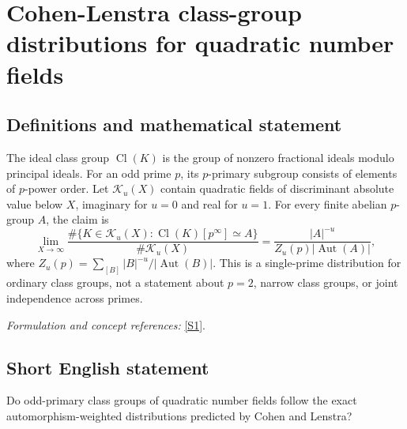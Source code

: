 \documentclass[11pt,a4paper]{article}
\newcommand{\sref}[2]{\hyperlink{source:#1:#2}{[S#2]}}
\newif\ifshowcatalogue
\newcommand{\cataloguescope}[1]{\ifshowcatalogue
 \paragraph{Exact scope in the supplied catalogue.}
 \begin{quote}\small #1\end{quote}\fi}
\numberwithin{equation}{section}
\begin{document}
\setcounter{section}{0}
\clearpage
\section*{\texorpdfstring{Cohen-Lenstra class-group distributions for quadratic number fields}{Cohen-Lenstra class-group distributions for quadratic number fields}}\label{statement}
\subsection{Definitions and mathematical statement}
The ideal class group $\operatorname{Cl}(K)$ is the group of nonzero fractional ideals modulo principal ideals. For an odd prime $p$, its $p$-primary subgroup consists of elements of $p$-power order. Let $\mathcal K_u(X)$ contain quadratic fields of discriminant absolute value below $X$, imaginary for $u=0$ and real for $u=1$. For every finite abelian $p$-group $A$, the claim is
\[
 \lim_{X\to\infty}\frac{\#\{K\in\mathcal K_u(X):\operatorname{Cl}(K)[p^\infty]\simeq A\}}
 {\#\mathcal K_u(X)}=\frac{|A|^{-u}}{Z_u(p)|\operatorname{Aut}(A)|},
\]
where $Z_u(p)=\sum_{[B]}|B|^{-u}/|\operatorname{Aut}(B)|$. This is a single-prime distribution for ordinary class groups, not a statement about $p=2$, narrow class groups, or joint independence across primes.
\par\smallskip\textit{Formulation and concept references:} \sref{statement}{1}.
\cataloguescope{For u in \{0,1\} let K\_u(X) be the set of isomorphism classes of quadratic number fields K with |disc(K)| < X that are imaginary (u = 0) or real (u = 1). For each fixed odd prime p and each finite abelian p-group A, prove that the limit as X tends to infinity of \#\{K in K\_u(X) : Cl(K)[p\textasciicircum{}infinity] is isomorphic to A\} / \#K\_u(X) exists and equals (1/Z\_u(p)) * |A|\textasciicircum{}\{-u\} / |Aut(A)|, where Z\_u(p) is the sum over isomorphism classes of finite abelian p-groups B of |B|\textasciicircum{}\{-u\}/|Aut(B)| (so Z\_0(p) = prod\_\{i>=1\}(1-p\textasciicircum{}\{-i\})\textasciicircum{}\{-1\} and Z\_1(p) = prod\_\{i>=2\}(1-p\textasciicircum{}\{-i\})\textasciicircum{}\{-1\}). Cl(K) is the ordinary ideal class group and Cl(K)[p\textasciicircum{}infinity] its Sylow p-subgroup. No assertion is made for p = 2, for narrow class groups, for a joint law over several primes, or for any non-quadratic family.}
\subsection{Short English statement}
Do odd-primary class groups of quadratic number fields follow the exact automorphism-weighted distributions predicted by Cohen and Lenstra?
\end{document}
